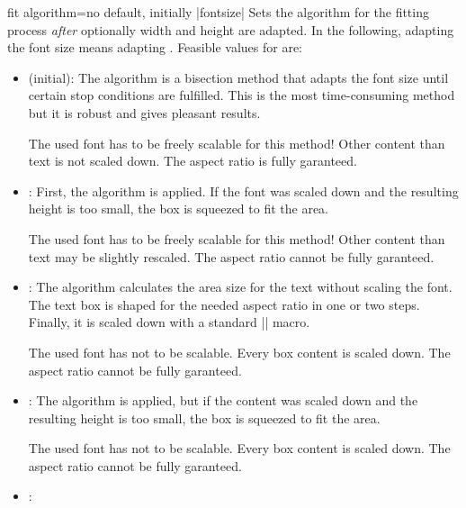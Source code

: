  
\begin{docTcbKey}{fit algorithm}{=}{no default, initially |fontsize|}
Sets the algorithm for the fitting process \emph{after} optionally width and height
are adapted. In the following, adapting the font size means adapting
.
  Feasible values for  are:
  \begin{itemize}
  \item{} (initial):
    The algorithm is a bisection method that adapts the font size until
    certain stop conditions are fulfilled. This is the most time-consuming
    method but it is robust and gives pleasant results.
    \begin{marker}
    The used font has to be freely scalable for this method!
    Other content than text is not scaled down.
    The aspect ratio is fully garanteed.
    \end{marker}
  \item{}:
    First, the  algorithm is applied. If the font was scaled down
    and the resulting height is too small, the box is squeezed to fit the area.
    \begin{marker}
    The used font has to be freely scalable for this method!
    Other content than text may be slightly rescaled.
    The aspect ratio cannot be fully garanteed.
    \end{marker}
  \item{}:
    The algorithm calculates the area size for the text without scaling the font.
    The text box is shaped for the needed aspect ratio in one or two
    steps. Finally, it is scaled down with a standard |\resizebox| macro.
    \begin{marker}
    The used font has not to be scalable. Every box content is scaled down.
    The aspect ratio cannot be fully garanteed.
    \end{marker}
  \item{}:
    The  algorithm is applied, but if the content was scaled
    down and the resulting height is too small, the box is squeezed to fit the area.
    \begin{marker}
    The used font has not to be scalable. Every box content is scaled down.
    The aspect ratio cannot be fully garanteed.
    \end{marker}
  \item{}:

\end{itemize}
\end{docTcbKey}
